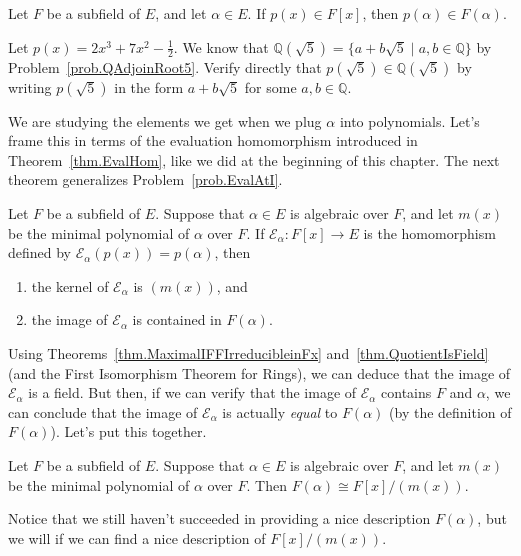 \begin{theorem}
Let $F$ be a subfield of $E$, and let $\alpha\in E$. If $p(x)\in F[x]$, then $p(\alpha) \in F(\alpha)$.
\end{theorem}

\begin{problem}
Let $p(x) = 2x^3+7x^2-\frac{1}{2}$. We know that $\mathbb{Q}(\sqrt{5}) = \{a+b\sqrt{5}\mid a,b\in \mathbb{Q}\}$ by  Problem~\ref{prob.QAdjoinRoot5}. Verify directly that $p(\sqrt{5}) \in \mathbb{Q}(\sqrt{5})$ by writing $p(\sqrt{5})$ in the form $a+b\sqrt{5}$ for some $a,b\in \mathbb{Q}$.
\end{problem}

We are studying the elements we get when we plug $\alpha$ into polynomials. Let's frame this in terms of the evaluation homomorphism introduced in Theorem~\ref{thm.EvalHom}, like we did at the beginning of this chapter. The next theorem generalizes Problem~\ref{prob.EvalAtI}.

\begin{theorem}
Let $F$ be a subfield of $E$. Suppose that $\alpha\in E$ is algebraic over $F$, and let $m(x)$ be the minimal polynomial of $\alpha$ over $F$. If $\mathcal{E}_\alpha:F[x] \rightarrow E$ is the homomorphism defined by $\mathcal{E}_\alpha(p(x)) = p(\alpha)$, then 
\begin{enumerate}
\item the kernel of $\mathcal{E}_\alpha$ is $(m(x))$, and
\item the image of $\mathcal{E}_\alpha$ is contained in $F(\alpha)$.
\end{enumerate}
\end{theorem}

Using Theorems~\ref{thm.MaximalIFFIrreducibleinFx} and~\ref{thm.QuotientIsField} (and the First Isomorphism Theorem for Rings), we can deduce that the image of $\mathcal{E}_\alpha$ is a field. But then, if we can verify that the image of $\mathcal{E}_\alpha$ contains $F$ and $\alpha$, we can conclude that the image of $\mathcal{E}_\alpha$ is actually \emph{equal} to $F(\alpha)$ (by the definition of $F(\alpha)$). Let's put this together.

\begin{theorem}
Let $F$ be a subfield of $E$. Suppose that $\alpha\in E$ is algebraic over $F$, and let $m(x)$ be the minimal polynomial of $\alpha$ over $F$. Then 
$F(\alpha) \cong F[x]/(m(x)).$
\end{theorem}

Notice that we still haven't succeeded in providing a nice description $F(\alpha)$, but we will if we can find a nice description of $F[x]/(m(x))$.

